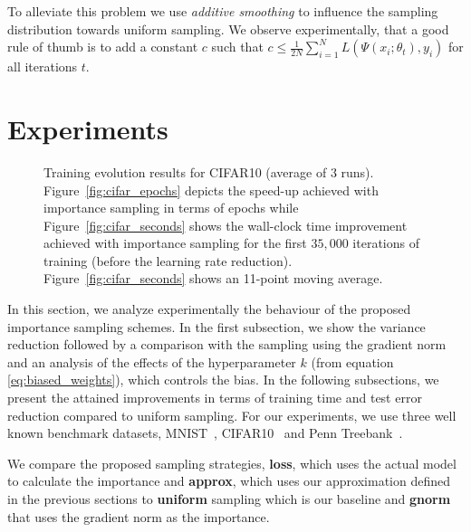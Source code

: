 \documentclass{article}
\begin{document}
To alleviate this problem we use \emph{additive smoothing} to influence the
sampling distribution towards uniform sampling. We observe experimentally, that
a good rule of thumb is to add a constant $c$ such that $c \leq \frac{1}{2N}
\sum_{i=1}^N L(\Psi(x_i; \theta_t), y_i)$ for all iterations $t$.

\section{Experiments}\label{sec:experiments}

\begin{figure*}
    \caption{Training evolution results for CIFAR10 (average of $3$ runs).
    Figure~\ref{fig:cifar_epochs} depicts the speed-up achieved with importance
    sampling in terms of epochs while Figure~\ref{fig:cifar_seconds} shows the
    wall-clock time improvement achieved with importance sampling for the first
    $35,000$ iterations of training (before the learning rate reduction).
    Figure~\ref{fig:cifar_seconds} shows an 11-point moving average.}
    \label{fig:cifar}
\end{figure*}

In this section, we analyze experimentally the behaviour of the proposed
importance sampling schemes. In the first subsection, we show the variance
reduction followed by a comparison with the sampling using the gradient norm
and an analysis of the effects of the hyperparameter $k$ (from equation
\ref{eq:biased_weights}), which controls the bias. In the following
subsections, we present the attained improvements in terms of training time and
test error reduction compared to uniform sampling. For our experiments, we use
three well known benchmark datasets, MNIST~\cite{lecun1998mnist},
CIFAR10~\cite{krizhevsky2009learning} and Penn
Treebank~\cite{marcus1993building}.

We compare the proposed sampling strategies, \textbf{loss}, which uses the
actual model to calculate the importance and \textbf{approx}, which uses our
approximation defined in the previous sections to \textbf{uniform} sampling
which is our baseline and \textbf{gnorm} that uses the gradient norm as the
importance.
\end{document}
